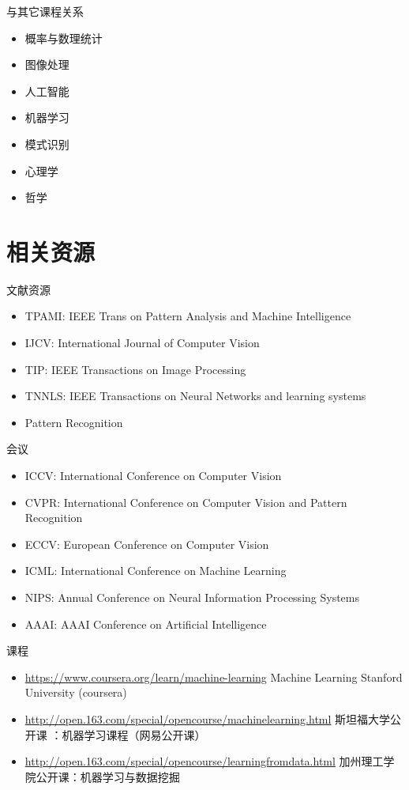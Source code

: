 \documentclass[presentation]{beamer}
\begin{document}
\begin{frame}[label={sec:orgdefc866}]{与其它课程关系}
\begin{itemize}
\item 概率与数理统计
\item 图像处理
\item 人工智能
\item 机器学习
\item 模式识别
\item 心理学
\item 哲学
\end{itemize}
\end{frame}


\section{相关资源}
\label{sec:org7429d4a}
\begin{frame}[label={sec:org46c112f}]{文献资源}
\begin{itemize}
\item TPAMI: IEEE Trans on Pattern Analysis and Machine Intelligence
\item IJCV: International Journal of Computer Vision
\item TIP: IEEE Transactions on Image Processing
\item TNNLS: IEEE Transactions on Neural Networks and learning systems
\item Pattern Recognition
\end{itemize}
\end{frame}
\begin{frame}[label={sec:orgfcd297a}]{会议}
\begin{itemize}
\item ICCV: International Conference on Computer Vision
\item CVPR: International Conference on Computer Vision and Pattern Recognition
\item ECCV: European Conference on Computer Vision
\item ICML: International Conference on Machine Learning
\item NIPS: Annual Conference on Neural Information Processing Systems
\item AAAI: AAAI Conference on Artificial Intelligence
\end{itemize}
\end{frame}

\begin{frame}[label={sec:org91832f2}]{课程}
\begin{itemize}
\item \url{https://www.coursera.org/learn/machine-learning}  Machine Learning Stanford University (coursera)
\item \url{http://open.163.com/special/opencourse/machinelearning.html}  斯坦福大学公开课 ：机器学习课程（网易公开课）
\item \url{http://open.163.com/special/opencourse/learningfromdata.html} 加州理工学院公开课：机器学习与数据挖掘
\end{itemize}
\end{frame}
\end{document}
